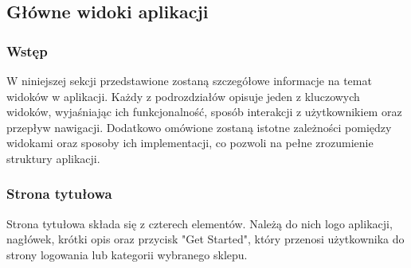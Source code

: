 \subsection{Główne widoki aplikacji}

\subsubsection{Wstęp}

W niniejszej sekcji przedstawione zostaną szczegółowe informacje na temat widoków w aplikacji. Każdy z podrozdziałów opisuje jeden z kluczowych widoków, wyjaśniając ich funkcjonalność, sposób interakcji z użytkownikiem oraz przepływ nawigacji. Dodatkowo omówione zostaną istotne zależności pomiędzy widokami oraz sposoby ich implementacji, co pozwoli na pełne zrozumienie struktury aplikacji.

\subsubsection{Strona tytułowa}

Strona tytułowa składa się z czterech elementów. Należą do nich logo aplikacji, nagłówek, krótki opis oraz przycisk "Get Started", który przenosi użytkownika do strony logowania lub kategorii wybranego sklepu.

